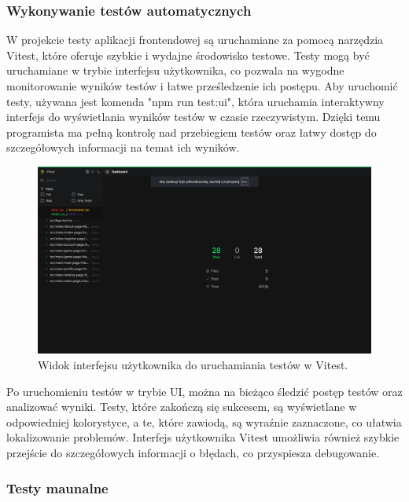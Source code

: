 \documentclass[12pt,a4paper]{article}
\begin{document}
\newpage

\subsubsection{Wykonywanie testów automatycznych}

\noindent
W projekcie testy aplikacji frontendowej są uruchamiane za pomocą narzędzia Vitest, które oferuje szybkie i wydajne środowisko testowe. Testy mogą być uruchamiane w trybie interfejsu użytkownika, co pozwala na wygodne monitorowanie wyników testów i łatwe prześledzenie ich postępu. Aby uruchomić testy, używana jest komenda "npm run test:ui", która uruchamia interaktywny interfejs do wyświetlania wyników testów w czasie rzeczywistym. Dzięki temu programista ma pełną kontrolę nad przebiegiem testów oraz łatwy dostęp do szczegółowych informacji na temat ich wyników.

\vspace{0.5cm}
\begin{figure}[h!]
    \centering
    \includegraphics[width=1\textwidth]{images/tests_front.png}
    \caption{Widok interfejsu użytkownika do uruchamiania testów w Vitest.}
\end{figure}
\vspace{0.5cm}

\noindent
Po uruchomieniu testów w trybie UI, można na bieżąco śledzić postęp testów oraz analizować wyniki. Testy, które zakończą się sukcesem, są wyświetlane w odpowiedniej kolorystyce, a te, które zawiodą, są wyraźnie zaznaczone, co ułatwia lokalizowanie problemów. Interfejs użytkownika Vitest umożliwia również szybkie przejście do szczegółowych informacji o błędach, co przyspiesza debugowanie.

\newpage

\subsubsection{Testy maunalne}
\end{document}
